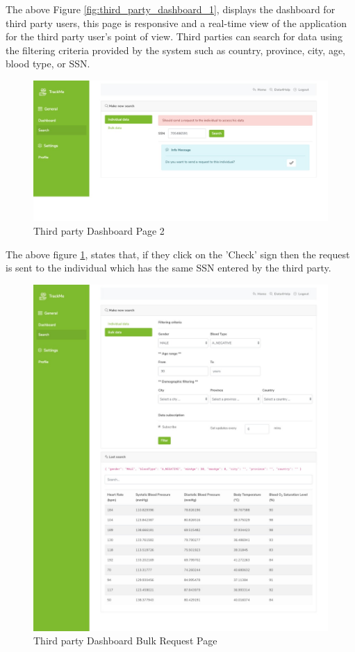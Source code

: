 \documentclass[a4paper, hidelinks, 12pt]{report}
\begin{document}
	The above Figure \ref{fig:third_party_dashboard_1}, displays the dashboard for third party users, this page is responsive and a real-time view of the application for the third party user's point of view. Third parties can search for  data using the filtering criteria provided by the system such as country, province, city, age, blood type, or SSN.
	\begin{figure}[H]
		\centering
		\includegraphics[width=1\textwidth]{UI/UI/6.jpeg}
		\caption[UI: Third party Dashboard Page 2]{Third party Dashboard Page 2}
		\label{fig:third_party_dashboard_2}
	\end{figure}
	
	The above figure \ref{fig:third_party_dashboard_2}, states that, if they click on the 'Check' sign then the request is sent to the individual which has the same SSN entered by the third party.
	\begin{figure}[H]
		\centering
		\includegraphics[width=1\textwidth]{UI/UI/1.jpeg}
		\caption[UI: Third party Dashboard Bulk Request Page]{Third party Dashboard Bulk Request Page}
		\label{fig:third_party_Bulk_Request_Page}
	\end{figure}
	
\end{document}
